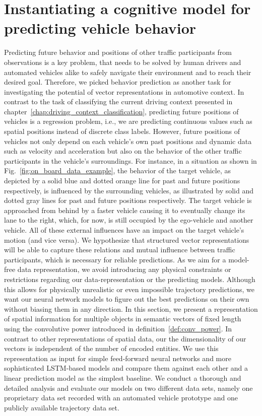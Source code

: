 \chapter{Instantiating a cognitive model for predicting vehicle behavior}
\label{chap:behav_pred}


Predicting future behavior and positions of other traffic participants from observations is a key problem, that needs to be solved by human drivers and automated vehicles alike to safely navigate their environment and to reach their desired goal.
Therefore, we picked behavior prediction as another task for investigating the potential of vector representations in automotive context.
In contrast to the task of classifying the current driving context presented in chapter~\ref{chap:driving_context_classification}, predicting future positions of vehicles is a regression problem, i.e., we are predicting continuous values such as spatial positions instead of discrete class labels.
However, future positions of vehicles not only depend on each vehicle's own past positions and dynamic data such as velocity and acceleration but also on the behavior of the other traffic participants in the vehicle's surroundings.
For instance, in a situation as shown in Fig.~\ref{fig:on_board_data_example}, the behavior of the target vehicle, as depicted by a solid blue and dotted orange line for past and future positions respectively, is influenced by the surrounding vehicles, as illustrated by solid and dotted gray lines for past and future positions respectively.
The target vehicle is approached from behind by a faster vehicle causing it to eventually change its lane to the right, which, for now, is still occupied by the ego-vehicle and another vehicle.
All of these external influences have an impact on the target vehicle's motion (and vice versa).
We hypothesize that structured vector representations will be able to capture these relations and mutual influence between traffic participants, which is necessary for reliable predictions.
As we aim for a model-free data representation, we avoid introducing any physical constraints or restrictions regarding our data-representation or the predicting models.
Although this allows for physically unrealistic or even impossible trajectory predictions, we want our neural network models to figure out the best predictions on their own without biasing them in any direction.
In this section, we present a representation of spatial information for multiple objects in semantic vectors of fixed length using the convolutive power introduced in definition~\ref{def:conv_power}.
In contrast to other representations of spatial data, our the dimensionality of our vectors is independent of the number of encoded entities.
We use this representation as input for simple feed-forward neural networks and more sophisticated \ac{LSTM}-based models and compare them against each other and a linear prediction model as the simplest baseline.
We conduct a thorough and detailed analysis and evaluate our  models on two different data sets, namely one proprietary data set recorded with an automated vehicle prototype and one publicly available trajectory data set.

